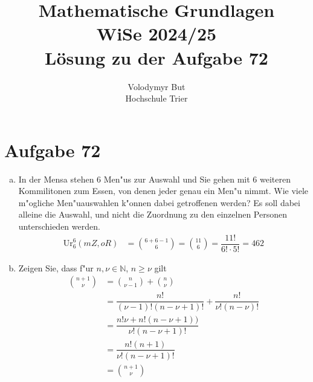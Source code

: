 \documentclass[10pt, oneside]{article}
\title{Mathematische Grundlagen\\[10pt]\Large{WiSe 2024/25}\\[15pt]\Large{L{\"o}sung zu der Aufgabe 72}}
\author{Volodymyr But\\[10pt]Hochschule Trier}
\date{}
\begin{document}
\maketitle
\vspace{25px}

\section{Aufgabe 72}

\begin{enumerate}[(a)]
    \item In der Mensa stehen 6 Men"us zur Auswahl und Sie gehen mit 6 weiteren
        Kommilitonen zum Essen, von denen jeder genau ein Men"u nimmt. Wie
        viele m"ogliche Men"uauswahlen k"onnen dabei getroffenen werden? Es
        soll dabei alleine die Auswahl, und nicht die Zuordnung zu den
        einzelnen Personen unterschieden werden.
        \begin{align*}
            \text{Ur}_6^6(mZ, oR) &= \binom{6 + 6 - 1}{6} = \binom{11}{6} = \dfrac{11!}{6!\cdot5!} = 462
        \end{align*}
    \item Zeigen Sie, dass f"ur $n, \nu \in \mathbb{N}$, $n \geq \nu$ gilt
        \begin{align*}
            \binom{n + 1}{\nu} &= \binom{n}{\nu - 1} + \binom{n}{\nu} \\[5pt]
                               &= \dfrac{n!}{(\nu - 1)!(n - \nu + 1)!} + \dfrac{n!}{\nu!(n - \nu)!} \\[5pt]
                               &= \dfrac{n!\nu + n!(n - \nu + 1))}{\nu!(n - \nu + 1)!} \\[5pt]
                               &= \dfrac{n!(n + 1)}{\nu!(n - \nu + 1)!} \\[5pt]
                               &= \binom{n + 1}{\nu}
        \end{align*}
\end{enumerate}
\end{document}
